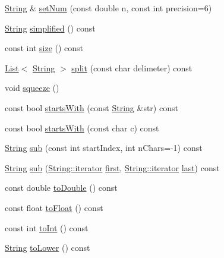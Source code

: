 \begin{DoxyCompactItemize}
\item 
\hyperlink{classprism_1_1_string}{String} \& \hyperlink{classprism_1_1_string_a2e346d9f08d74e3bbc0361b65692d846}{set\+Num} (const double n, const int precision=6)
\item 
\hyperlink{classprism_1_1_string}{String} \hyperlink{classprism_1_1_string_a6afd376891e93bc92379f25bc8e4cca0}{simplified} () const 
\item 
const int \hyperlink{classprism_1_1_string_a603b5a90681d43adf7c6c29018e0300c}{size} () const 
\item 
\hyperlink{classprism_1_1_list}{List}$<$ \hyperlink{classprism_1_1_string}{String} $>$ \hyperlink{classprism_1_1_string_a3db808efeefc30d17e7c59e0ae250525}{split} (const char delimeter) const 
\item 
void \hyperlink{classprism_1_1_string_a326c3afd3ed5b99dd53217e492526e0a}{squeeze} ()
\item 
const bool \hyperlink{classprism_1_1_string_ae9ce1b5a274fc4b672944da555552456}{starts\+With} (const \hyperlink{classprism_1_1_string}{String} \&str) const 
\item 
const bool \hyperlink{classprism_1_1_string_a5ce3cf5ba78faa6c9179fb777cc4c6ac}{starts\+With} (const char c) const 
\item 
\hyperlink{classprism_1_1_string}{String} \hyperlink{classprism_1_1_string_ab2224646e96ae71e4048e969da2fca93}{sub} (const int start\+Index, int n\+Chars=-\/1) const 
\item 
\hyperlink{classprism_1_1_string}{String} \hyperlink{classprism_1_1_string_acb6b7f719571cccca2f08887e61ed2a5}{sub} (\hyperlink{classprism_1_1_string_adacc7975837e5fff95d70690777fb330}{String\+::iterator} \hyperlink{namespaceprism_ae3fb7a1926a9e8e59300cd5e370470da}{first}, \hyperlink{classprism_1_1_string_adacc7975837e5fff95d70690777fb330}{String\+::iterator} \hyperlink{namespaceprism_abe4956c4e865f55ca126b7fb973b5078}{last}) const 
\item 
const double \hyperlink{classprism_1_1_string_a9c8060a9bea6e9967e8b9714c04d6396}{to\+Double} () const 
\item 
const float \hyperlink{classprism_1_1_string_a4fcdc9050798010ab0b36a6e4ff053c9}{to\+Float} () const 
\item 
const int \hyperlink{classprism_1_1_string_afbf22d03096777ef6909794edc18a0f9}{to\+Int} () const 
\item 
\hyperlink{classprism_1_1_string}{String} \hyperlink{classprism_1_1_string_ac75330b46da019ccf2c964e4c2fd9f81}{to\+Lower} () const 
\item 

\end{DoxyCompactItemize}

